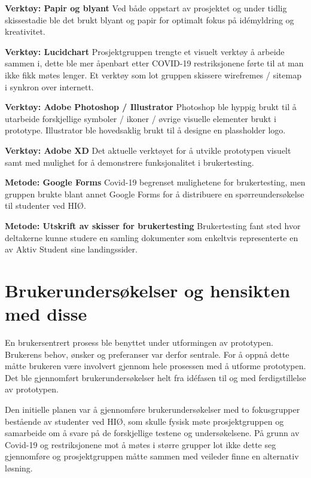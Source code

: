 \begin{compactitem}
\item [{\bf  Verktøy: Papir og blyant} ] Ved både oppstart av prosjektet og under tidlig skissestadie ble det brukt blyant og papir for optimalt fokus på idémyldring og kreativitet.
\item [{\bf  Verktøy: Lucidchart} ] Prosjektgruppen trengte et visuelt verktøy å arbeide sammen i, dette ble mer åpenbart etter COVID-19 restriksjonene førte til at man ikke fikk møtes lenger. Et verktøy som lot gruppen skissere wirefremes / sitemap i synkron over internett.
\item [{\bf  Verktøy: Adobe Photoshop / Illustrator} ] Photoshop ble hyppig brukt til å utarbeide forskjellige symboler / ikoner / øvrige visuelle elementer brukt i prototype. Illustrator ble hovedsaklig brukt til å designe en plassholder logo.
\item [{\bf  Verktøy: Adobe XD} ] Det aktuelle verktøyet for å utvikle prototypen visuelt samt med mulighet for å demonstrere funksjonalitet i brukertesting.
\item [{\bf  Metode: Google Forms} ] Covid-19 begrenset mulighetene for brukertesting, men gruppen brukte blant annet Google Forms for å distribuere en spørreundersøkelse til studenter ved HIØ.
\item [{\bf  Metode: Utskrift av skisser for brukertesting} ] Brukertesting fant sted hvor deltakerne kunne studere en samling dokumenter som enkeltvis representerte en av Aktiv Student sine landingssider.
\end{compactitem} 

\section{Brukerundersøkelser og hensikten med disse}
En brukersentrert prosess ble benyttet under utformingen av prototypen. Brukerens behov, ønsker og preferanser var derfor sentrale. For å oppnå dette måtte brukeren være involvert gjennom hele prosessen med å utforme prototypen. Det ble gjennomført brukerundersøkelser helt fra idéfasen til og med ferdigstillelse av prototypen.


Den initielle planen var å gjennomføre brukerundersøkelser med to fokusgrupper bestående av studenter ved HIØ, som skulle fysisk møte prosjektgruppen og samarbeide om å svare på de forskjellige testene og undersøkelsene. På grunn av Covid-19 og restriksjonene mot å møtes i større grupper lot ikke dette seg gjennomføre og prosjektgruppen måtte sammen med veileder finne en alternativ løsning.

